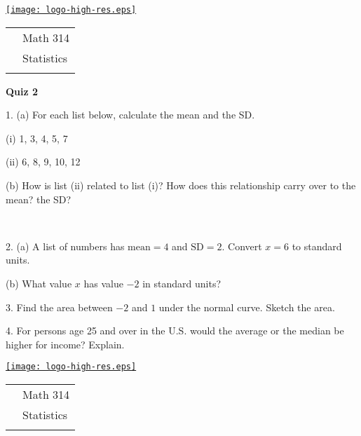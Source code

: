 \documentclass[10pt]{article}
\begin{document}
\pagestyle{empty}
\lstset{language=R, showspaces=false, showstringspaces=false}

\href{http://www.shepherd.edu}{\texttt{[image: logo-high-res.eps]}}
\vspace{-1.69cm}

{\small
\begin{tabular}{cl}
& Math 314\\
& Statistics\\
\hspace{5.28in} & %
\end{tabular}
}
\setlength{\baselineskip}{1.05\baselineskip}
\bigskip

\begin{center}
\textbf{\large  Quiz 2}
\end{center}
\medskip


1. (a) For each list below, calculate the mean and the SD.

\hspace{20pt} (i) 1, 3, 4, 5, 7\vspace{2.5in}

\hspace{20pt} (ii) 6, 8, 9, 10, 12\vspace{2.5in}

\hphantom{1. } (b) How is list (ii) related to list (i)?  How does this
relationship carry over to the mean?  the SD?

\vfill
\eject
{\ }

2. (a) A list of numbers has $\mbox{mean}=4$ and $\mbox{SD}=2$.
Convert $x=6$ to standard units.
\vspace{1.5in}

\hphantom{2. } (b) What  value $x$ has value $-2$ in standard units?
\vspace{1.5in}

3. Find the area between $-2$ and $1$ under the normal curve.  Sketch the area.
\vspace{3.5in}

4. For persons age 25 and over in the U.S. would the average or the median be 
higher for income?  Explain.
\vfill
\eject


\pagestyle{empty}
\lstset{language=R, showspaces=false, showstringspaces=false}

\href{http://www.shepherd.edu}{\texttt{[image: logo-high-res.eps]}}
\vspace{-1.69cm}

{\small
\begin{tabular}{cl}
& Math 314\\
& Statistics\\
\hspace{5.28in} & %
\end{tabular}
}
\setlength{\baselineskip}{1.05\baselineskip}
\bigskip
\end{document}
